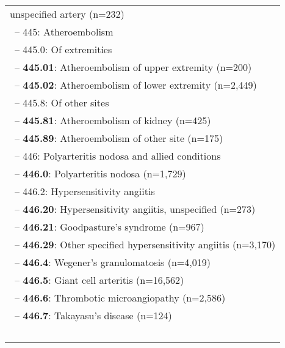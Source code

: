 \begin{longtable}{p{\textwidth}}
unspecified artery (n=232)} \\ \-\ \hspace{20pt}\footnotesize{-- 445: Atheroembolism} \\ \-\ \hspace{30pt}\footnotesize{-- 445.0: Of extremities} \\ \-\ \hspace{40pt}\footnotesize{-- {\color{ForestGreen} \textbf{445.01}}: Atheroembolism of upper extremity (n=200)} \\ \-\ \hspace{40pt}\footnotesize{-- {\color{ForestGreen} \textbf{445.02}}: Atheroembolism of lower extremity (n=2,449)} \\ \-\ \hspace{30pt}\footnotesize{-- 445.8: Of other sites} \\ \-\ \hspace{40pt}\footnotesize{-- {\color{ForestGreen} \textbf{445.81}}: Atheroembolism of kidney (n=425)} \\ \-\ \hspace{40pt}\footnotesize{-- {\color{ForestGreen} \textbf{445.89}}: Atheroembolism of other site (n=175)} \\ \-\ \hspace{20pt}\footnotesize{-- 446: Polyarteritis nodosa and allied conditions} \\ \-\ \hspace{30pt}\footnotesize{-- {\color{ForestGreen} \textbf{446.0}}: Polyarteritis nodosa (n=1,729)} \\ \-\ \hspace{30pt}\footnotesize{-- 446.2: Hypersensitivity angiitis} \\ \-\ \hspace{40pt}\footnotesize{-- {\color{ForestGreen} \textbf{446.20}}: Hypersensitivity angiitis, unspecified (n=273)} \\ \-\ \hspace{40pt}\footnotesize{-- {\color{ForestGreen} \textbf{446.21}}: Goodpasture's syndrome (n=967)} \\ \-\ \hspace{40pt}\footnotesize{-- {\color{ForestGreen} \textbf{446.29}}: Other specified hypersensitivity angiitis (n=3,170)} \\ \-\ \hspace{30pt}\footnotesize{-- {\color{ForestGreen} \textbf{446.4}}: Wegener's granulomatosis (n=4,019)} \\ \-\ \hspace{30pt}\footnotesize{-- {\color{ForestGreen} \textbf{446.5}}: Giant cell arteritis (n=16,562)} \\ \-\ \hspace{30pt}\footnotesize{-- {\color{ForestGreen} \textbf{446.6}}: Thrombotic microangiopathy (n=2,586)} \\ \-\ \hspace{30pt}\footnotesize{-- {\color{ForestGreen} \textbf{446.7}}: Takayasu's disease (n=124)} \\ \-\ \hspace{20pt}\footnotesize{-- 447: Other disorders of 
\end{longtable}
